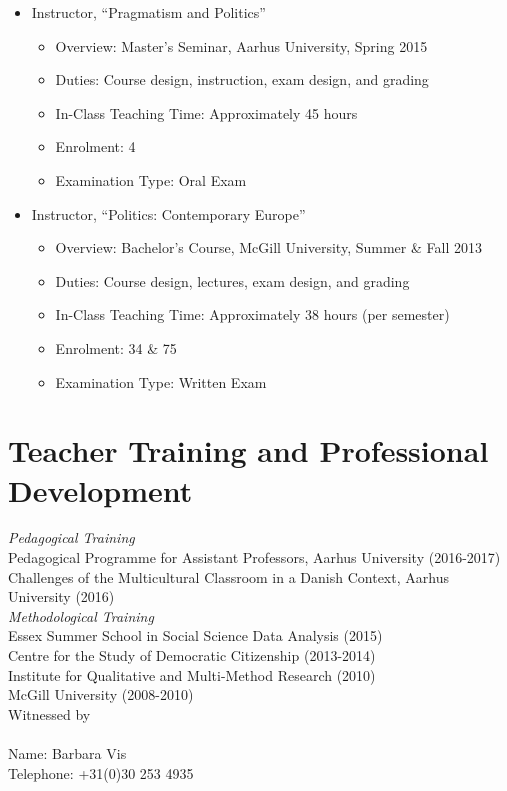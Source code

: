 \documentclass[letterpaper,fontsize=10pt]{scrartcl}
\begin{document}
\begin{itemize}[noitemsep]
\begin{itemize}[noitemsep]
				\end{itemize}
			\item Instructor, “Pragmatism and Politics”\\[-3.5ex]
			\begin{itemize}[noitemsep]
					\item Overview: Master’s Seminar, Aarhus University, Spring 2015
					\item Duties: Course design, instruction, exam design, and grading
          \item In-Class Teaching Time: Approximately 45 hours
					\item Enrolment: 4
					\item Examination Type: Oral Exam
			\end{itemize}
			\item Instructor, “Politics: Contemporary Europe”\\[-3.5ex]
			\begin{itemize}[noitemsep]
					\item Overview: Bachelor’s Course, McGill University, Summer \& Fall 2013
					\item Duties: Course design, lectures, exam design, and grading
          \item In-Class Teaching Time: Approximately 38 hours (per semester)
					\item Enrolment: 34 \& 75
					\item Examination Type: Written Exam
			\end{itemize}
	\end{itemize}

\section{Teacher Training and Professional Development}
\vspace{-1em}

\textit{Pedagogical Training}\\ 
Pedagogical Programme for Assistant Professors, Aarhus University (2016-2017)\\
Challenges of the Multicultural Classroom in a Danish Context, Aarhus University (2016)\\

\textit{Methodological Training}\\
Essex Summer School in Social Science Data Analysis (2015)\\
Centre for the Study of Democratic Citizenship (2013-2014)\\
Institute for Qualitative and Multi-Method Research (2010)\\
McGill University (2008-2010)\\

Witnessed by\\
\\
Name: Barbara Vis\\
Telephone: +31(0)30 253 4935
\end{document}
